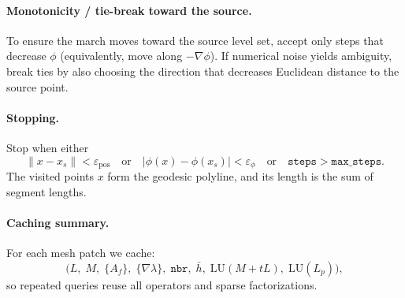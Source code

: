 \documentclass[12pt,a4paper]{article}
\theoremstyle{plain}
\theoremstyle{definition}
\begin{document}
	\paragraph{Monotonicity / tie-break toward the source.}
	To ensure the march moves toward the source level set, accept only steps that decrease \(\phi\)
	(equivalently, move along \(-\nabla\phi\)). If numerical noise yields ambiguity, break ties by
	also choosing the direction that decreases Euclidean distance to the source point.
	
	\paragraph{Stopping.}
	Stop when either
	\[
	\|x - x_s\| < \varepsilon_{\mathrm{pos}}
	\quad\text{or}\quad
	|\phi(x)-\phi(x_s)| < \varepsilon_{\phi}
	\quad\text{or}\quad
	\texttt{steps}>\texttt{max\_steps}.
	\]
	The visited points \(x\) form the geodesic polyline, and its length is the sum of segment lengths.
	
	\paragraph{Caching summary.}
	For each mesh patch we cache:
	\[
	\bigl(L,\; M,\; \{A_f\},\; \{\nabla\lambda\},\; \texttt{nbr},\; \bar{h},\;
	\mathrm{LU}(M+tL),\; \mathrm{LU}(L_p)\bigr),
	\]
	so repeated queries reuse all operators and sparse factorizations.
	
	
\end{document}
